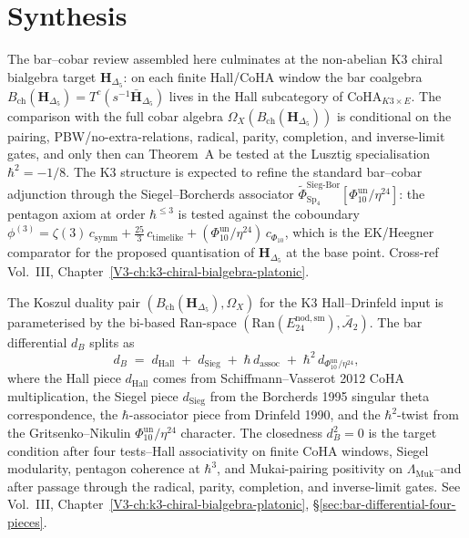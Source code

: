 \section{Synthesis}
\label{sec:bar-cobar-review-supplement}

\begin{remark}
\label{rem:bar-cobar-review-1}
The bar--cobar review assembled here culminates at the non-abelian K3
chiral bialgebra target $\mathbf H_{\Delta_5}$: on each finite
Hall/CoHA window the bar coalgebra
$B_{\mathrm{ch}}(\mathbf H_{\Delta_5}) = T^c(s^{-1}\bar{\mathbf H}_{\Delta_5})$
lives in the Hall subcategory of $\mathrm{CoHA}_{K3\times E}$. The
comparison with the full cobar algebra
$\Omega_X(B_{\mathrm{ch}}(\mathbf H_{\Delta_5}))$ is conditional on the
pairing, PBW/no-extra-relations, radical, parity, completion, and
inverse-limit gates, and only then can Theorem~A be tested at the
Lusztig specialisation $\hbar^2 = -1/8$. The K3 structure is expected
to refine the standard bar--cobar adjunction through the
Siegel--Borcherds associator
$\widetilde{\Phi}^{\mathrm{Sieg\text{-}Bor}}_{\mathrm{Sp}_4}[\Phi_{10}^{\mathrm{un}}/\eta^{24}]$:
the pentagon axiom at order $\hbar^{\le 3}$ is tested against the
coboundary
$\phi^{(3)} = \zeta(3)\, c_{\mathrm{symm}} + \tfrac{25}{3}\, c_{\mathrm{timelike}} + (\Phi_{10}^{\mathrm{un}}/\eta^{24})\, c_{\Phi_{10}}$,
which is the EK/Heegner comparator for the proposed quantisation of
$\mathbf H_{\Delta_5}$ at the base point. Cross-ref Vol.~III,
Chapter~\ref{V3-ch:k3-chiral-bialgebra-platonic}.
\end{remark}

\begin{remark}
\label{rem:bar-cobar-review-2}
The Koszul duality pair $(B_{\mathrm{ch}}(\mathbf H_{\Delta_5}), \Omega_X)$
for the K3 Hall--Drinfeld input is parameterised by the bi-based Ran-space
$(\mathrm{Ran}(E^{\mathrm{nod,sm}}_{24}), \bar{\mathcal A}_2)$. The bar
differential $d_B$ splits as
\[
d_B \;=\; d_{\mathrm{Hall}} \;+\; d_{\mathrm{Sieg}} \;+\; \hbar\, d_{\mathrm{assoc}} \;+\; \hbar^2\, d_{\Phi_{10}^{\mathrm{un}}/\eta^{24}},
\]
where the Hall piece $d_{\mathrm{Hall}}$ comes from Schiffmann--Vasserot
2012 CoHA multiplication, the Siegel piece $d_{\mathrm{Sieg}}$ from the
Borcherds 1995 singular theta correspondence, the $\hbar$-associator
piece from Drinfeld 1990, and the $\hbar^2$-twist from the
Gritsenko--Nikulin $\Phi_{10}^{\mathrm{un}}/\eta^{24}$ character. The closedness
$d_B^2 = 0$ is the target condition after four tests--Hall
associativity on finite CoHA windows, Siegel modularity,
pentagon coherence at $\hbar^3$, and Mukai-pairing positivity on
$\Lambda_{\mathrm{Muk}}$--and after passage through the radical,
parity, completion, and inverse-limit gates. See
Vol.~III, Chapter~\ref{V3-ch:k3-chiral-bialgebra-platonic},
\S\ref{sec:bar-differential-four-pieces}.
\end{remark}
